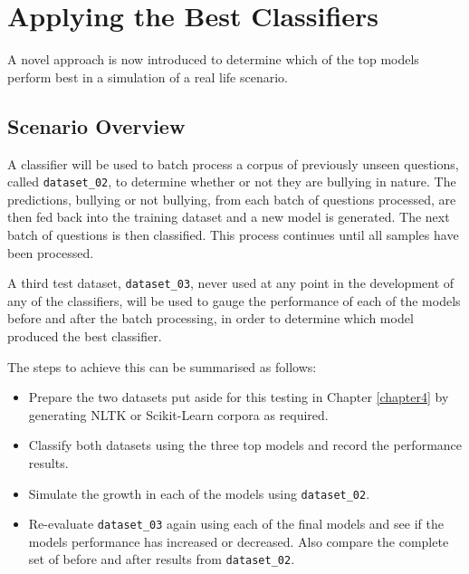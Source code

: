 \section{Applying the Best Classifiers}
\label{subsection:applying-classifiers}

A novel approach is now introduced to determine which of the top models perform best in a simulation of a real life scenario. 

\subsection{Scenario Overview}
A classifier will be used to batch process a corpus of previously unseen questions, called \verb|dataset_02|, to determine whether or not they are bullying in nature. The predictions, bullying or not bullying, from each batch of questions processed, are then fed back into the training dataset and a new model is generated. The next batch of questions is then classified. This process continues until all samples have been processed. 

A third test dataset, \verb|dataset_03|, never used at any point in the development of any of the classifiers, will be used to gauge the performance of each of the models before and after the batch processing, in order to determine which model produced the best classifier.

The steps to achieve this can be summarised as follows:

\begin{itemize}

	\item Prepare the two datasets put aside for this testing in Chapter \ref{chapter4} by generating NLTK or Scikit-Learn corpora as required.
	\item Classify both datasets using the three top models and record the performance results.
	\item Simulate the growth in each of the models using \verb|dataset_02|.
	\item Re-evaluate \verb|dataset_03| again using each of the final models and see if the models performance has increased or decreased. Also compare the complete set of before and after results from \verb|dataset_02|.

\end{itemize}

